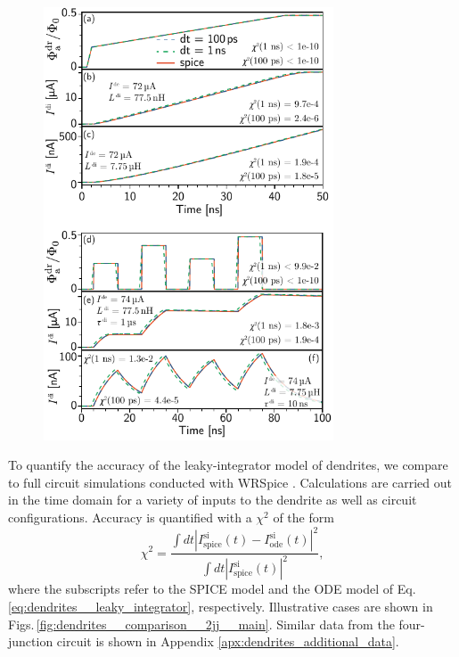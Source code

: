 \documentclass[twocolumn]{article}
\begin{document}
\begin{figure}[h!]
\includegraphics[width=8.6cm]{figures/_fig__dendrites__comparison__2jj__main.pdf}
\end{figure}
To quantify the accuracy of the leaky-integrator model of dendrites, we compare to full circuit simulations conducted with WRSpice \cite{wh1991}. Calculations are carried out in the time domain for a variety of inputs to the dendrite as well as circuit configurations. Accuracy is quantified with a $\chi^2$ of the form
\begin{equation}
\label{eq:chi_squared}
\chi^2 = \frac{\int dt \left|I^{\mathrm{si}}_{\mathrm{spice}}(t) - I^{\mathrm{si}}_{\mathrm{ode}}(t)\right|^2}{\int dt \left|I^{\mathrm{si}}_{\mathrm{spice}}(t)\right|^2},
\end{equation}
where the subscripts refer to the SPICE model and the ODE model of Eq.\,\ref{eq:dendrites__leaky_integrator}, respectively. Illustrative cases are shown in Figs.\,\ref{fig:dendrites__comparison__2jj__main}. Similar data from the four-junction circuit is shown in Appendix \ref{apx:dendrites_additional_data}. %




\end{document}
